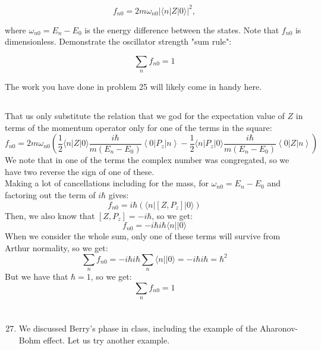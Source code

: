 \documentclass[12pt]{article}
\begin{document}
\begin{equation*}
f_{n 0}=2 m \omega_{n 0}|\langle n|Z| 0\rangle|^{2}, \tag{2}
\end{equation*}


where $\omega_{n 0}=E_{n}-E_{0}$ is the energy difference between the states. Note that $f_{n 0}$ is dimensionless. Demonstrate the oscillator strength "sum rule":


\begin{equation*}
\sum_{n} f_{n 0}=1 \tag{3}
\end{equation*}


The work you have done in problem 25 will likely come in handy here.
\subsection{}
That us only substitute the relation that we god for the expectation value of $Z$ in terms of the momentum operator only for one of the terms in the square:
\begin{equation}
  f_{n 0}=2 m \omega_{n 0}\left(\frac{1}{2}\langle n|Z| 0\rangle \frac{i\hbar}{m(E_n-E_0)}\left\langle 0\left|P_{z}\right| n\right\rangle - \frac{1}{2}\langle n|P_{z}| 0\rangle \frac{i\hbar}{m(E_n-E_0)}\left\langle 0\left|Z\right| n\right\rangle\right)
\end{equation}
We note that in one of the terms the complex number was congregated, so we have two reverse the sign of one of these.\\
Making a lot of cancellations including for the mass, for $\omega _{n0}= E_n-E_0$ and factoring out the term of $i\hbar$ gives:
\begin{equation}
  f_{n 0}=i\hbar\left(\langle n|[Z,P_z]| 0\rangle\right)
\end{equation}
Then, we also know that $[Z,P_z]=-i\hbar$, so we get:
\begin{equation}
  f_{n 0}=- i\hbar i\hbar \langle n|| 0\rangle
\end{equation}
When we consider the whole sum, only one of these terms will survive from Arthur normality, so we get:
\begin{equation}
  \sum_{n} f_{n 0}=-i\hbar i\hbar \sum_{n}\langle n|| 0\rangle = -i\hbar i\hbar = \hbar^2
\end{equation}
But we have that $\hbar = 1$, so we get:
\begin{equation}
  \sum_{n} f_{n 0}=1
\end{equation}

\section{}
\begin{enumerate}
  \setcounter{enumi}{26}
  \item We discussed Berry's phase in class, including the example of the Aharonov-Bohm effect. Let us try another example.
\end{enumerate}
\end{document}
